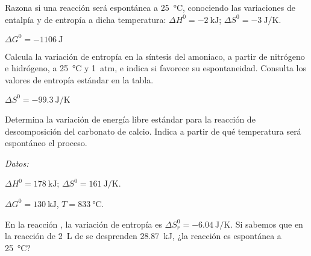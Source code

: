 \documentclass[10pt,a5paper,twoside]{article}
\newenvironment{gexdatos}{
      \vspace{4pt}
      \noindent\small\textit{Datos:}
    }{\vspace{5pt}}
\begin{document}
  \begin{exercise}[
      tags    = {termodinámica, espontaneidad, Gibbs},
      topics  = {química, termoquímica, termodinámica},
      source  = {},
    ]
    Razona si una reacción será espontánea a \SI{25}{\celsius}, conociendo las variaciones de entalpía y de entropía a dicha temperatura: \( \Delta H^0 = \SI{-2}{\kilo\joule} \); \( \Delta S^0 = \SI{-3}{\joule\per\kelvin} \).
  \end{exercise}

  \begin{solution}
    \( \Delta G^0 = \SI{-1106}{\joule} \)
  \end{solution}




  \begin{exercise}[
      tags    = {termodinámica, espontaneidad},
      topics  = {química, termoquímica, termodinámica},
      source  = {},
    ]
    Calcula la variación de entropía en la síntesis del amoniaco, a partir de nitrógeno e hidrógeno, a \SI{25}{\celsius} y \SI{1}{atm}, e indica si favorece su espontaneidad. Consulta los valores de entropía estándar en la tabla.
  \end{exercise}

  \begin{solution}
    \( \Delta S^0 = \SI{-99.3}{\joule\per\kelvin} \)
  \end{solution}




  \begin{exercise}[
      tags    = {termodinámica, espontaneidad, Gibbs},
      topics  = {química, termoquímica, termodinámica},
      source  = {},
    ]
    Determina la variación de energía libre estándar para la reacción de descomposición del carbonato de calcio. Indica a partir de qué temperatura será espontáneo el proceso.

    \begin{gexdatos}
      \( \Delta H^0 = \SI{178}{\kilo\joule} \); \( \Delta S^0 = \SI{161}{\joule\per\kelvin} \).
    \end{gexdatos}
  \end{exercise}

  \begin{solution}
    \( \Delta G^0 = \SI{130}{\kilo\joule} \), \( T = \SI{833}{\celsius} \).
  \end{solution}




  \begin{exercise}[
      tags    = {termodinámica, espontaneidad, Gibbs},
      topics  = {química, termoquímica, termodinámica},
      source  = {},
    ]
    En la reacción , la variación de entropía es \( \Delta S^0_r = \SI{-6.04}{\joule\per\kelvin} \). Si sabemos que en la reacción de \SI{2}{\liter} de  se desprenden \SI{28.87}{\kilo\joule}, ¿la reacción es espontánea a \SI{25}{\celsius}?
  \end{exercise}
\end{document}
